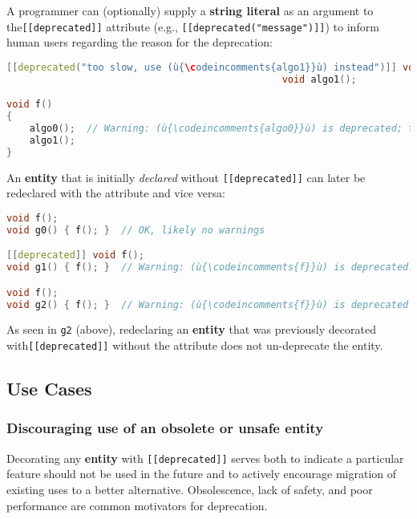 \noindent A programmer can (optionally) supply a \textbf{string literal} as an
argument to the\linebreak[4] \mbox{\texttt{[[deprecated]]}} attribute (e.g.,
\mbox{\texttt{[[deprecated("message")]]}}) to inform human users regarding the
reason for the deprecation:

\begin{lstlisting}[language=C++]
[[deprecated("too slow, use (ù{\codeincomments{algo1}}ù) instead")]] void algo0();
                                                void algo1();

void f()
{
    algo0();  // Warning: (ù{\codeincomments{algo0}}ù) is deprecated; too slow, use (ù{\codeincomments{algo1}}ù) instead.
    algo1();
}
\end{lstlisting}

\noindent An \textbf{entity} that is initially \emph{declared} without
\texttt{[[deprecated]]} can later be redeclared with the attribute and
vice versa:

\begin{lstlisting}[language=C++]
void f();
void g0() { f(); }  // OK, likely no warnings

[[deprecated]] void f();
void g1() { f(); }  // Warning: (ù{\codeincomments{f}}ù) is deprecated.

void f();
void g2() { f(); }  // Warning: (ù{\codeincomments{f}}ù) is deprecated (still).
\end{lstlisting}

\noindent As seen in \texttt{g2} (above), redeclaring an \textbf{entity} that was
previously decorated with\linebreak[4] \mbox{\texttt{[[deprecated]]}} without the attribute
does not un-deprecate the entity.

\subsection[Use Cases]{Use Cases}\label{use-cases}

\subsubsection[Discouraging use of an obsolete or unsafe \textbf{entity}]{Discouraging use of an obsolete or unsafe \textbf{entity}}\label{discouraging-use-of-an-obsolete-or-unsafe-entity}

Decorating any \textbf{entity} with \texttt{[[deprecated]]} serves both
to indicate a particular feature should not be used in the future and
to actively encourage migration of existing uses to a better
alternative. Obsolescence, lack of safety, and poor performance are
common motivators for deprecation.

